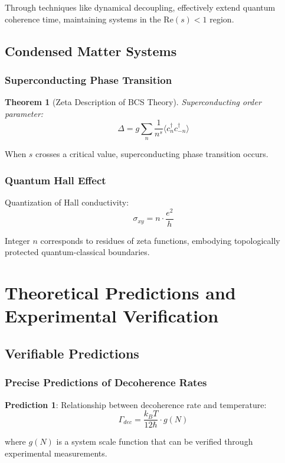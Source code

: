 \documentclass[11pt]{article}
\theoremstyle{plain}
\newtheorem{theorem}{Theorem}[section]
\theoremstyle{definition}
\theoremstyle{remark}
\begin{document}
Through techniques like dynamical decoupling, effectively extend quantum coherence time, maintaining systems in the $\text{Re}(s) < 1$ region.

\subsection{Condensed Matter Systems}

\subsubsection{Superconducting Phase Transition}

\begin{theorem}[Zeta Description of BCS Theory]
Superconducting order parameter:
$$\Delta = g \sum_{n} \frac{1}{n^s} \langle c_n^\dagger c_{-n}^\dagger \rangle$$
\end{theorem}

When $s$ crosses a critical value, superconducting phase transition occurs.

\subsubsection{Quantum Hall Effect}

Quantization of Hall conductivity:
$$\sigma_{xy} = n \cdot \frac{e^2}{h}$$

Integer $n$ corresponds to residues of zeta functions, embodying topologically protected quantum-classical boundaries.

\section{Theoretical Predictions and Experimental Verification}

\subsection{Verifiable Predictions}

\subsubsection{Precise Predictions of Decoherence Rates}

\textbf{Prediction 1}: Relationship between decoherence rate and temperature:
$$\Gamma_{dec} = \frac{k_B T}{12\hbar} \cdot g(N)$$

where $g(N)$ is a system scale function that can be verified through experimental measurements.
\end{document}
